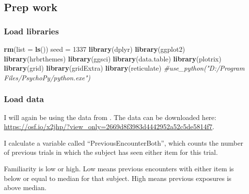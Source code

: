 \documentclass[
]{book}
\newenvironment{Shaded}{\begin{snugshade}}{\end{snugshade}}
\newcommand{\AttributeTok}[1]{\textcolor[rgb]{0.13,0.29,0.53}{#1}}
\newcommand{\CommentTok}[1]{\textcolor[rgb]{0.56,0.35,0.01}{\textit{#1}}}
\newcommand{\DecValTok}[1]{\textcolor[rgb]{0.00,0.00,0.81}{#1}}
\newcommand{\FunctionTok}[1]{\textcolor[rgb]{0.13,0.29,0.53}{\textbf{#1}}}
\newcommand{\NormalTok}[1]{#1}
\newcommand{\OtherTok}[1]{\textcolor[rgb]{0.56,0.35,0.01}{#1}}
\begin{document}
\hypertarget{prep-work-5}{%
\subsection{Prep work}\label{prep-work-5}}

\hypertarget{load-libraries-1}{%
\subsubsection{Load libraries}\label{load-libraries-1}}

\begin{Shaded}
\begin{Highlighting}[]
\FunctionTok{rm}\NormalTok{(}\AttributeTok{list =} \FunctionTok{ls}\NormalTok{())}
\NormalTok{seed }\OtherTok{=} \DecValTok{1337}
\FunctionTok{library}\NormalTok{(dplyr)}
\FunctionTok{library}\NormalTok{(ggplot2)}
\FunctionTok{library}\NormalTok{(hrbrthemes)}
\FunctionTok{library}\NormalTok{(ggsci)}
\FunctionTok{library}\NormalTok{(data.table)}
\FunctionTok{library}\NormalTok{(plotrix)}
\FunctionTok{library}\NormalTok{(grid)}
\FunctionTok{library}\NormalTok{(gridExtra)}
\FunctionTok{library}\NormalTok{(reticulate)}
\CommentTok{\#use\_python("D:/Program Files/PsychoPy/python.exe")}
\end{Highlighting}
\end{Shaded}

\hypertarget{load-data}{%
\subsubsection{Load data}\label{load-data}}

I will again be using the data from \citep{smith2018}. The data can be downloaded here:
\url{https://osf.io/x2jhp/?view_only=2669d8f3983d4442952a52c5de5814f7}.

I calculate a variable called ``PreviousEncounterBoth'', which counts the number of previous trials in which the subject has seen either item for this trial.

Familiarity is low or high. Low means previous encounters with either item is below or equal to median for that subject. High means previous exposures is above median.
\end{document}
